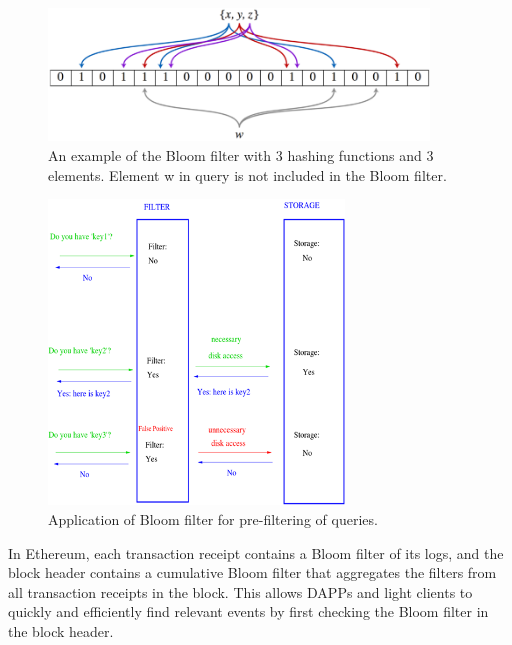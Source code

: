 \begin{figure}[t]
	\begin{center}
		\includegraphics[width=0.9\textwidth]{./figs/bloom.png}
		\caption{An example of the Bloom filter with 3 hashing functions  and 3 elements. Element w in query is not included in the Bloom filter.}		
		\label{fig:eth-bloom-filter}
	\end{center}	
\end{figure}


\begin{figure}[t]
	\begin{center}
		\includegraphics[width=0.7\textwidth]{./figs/bloom-eg.png}
		\caption{Application of Bloom filter for pre-filtering of queries.}		
		\label{fig:bloom-app}
	\end{center}	
\end{figure}



In Ethereum, each transaction receipt contains a Bloom filter of its logs, and the
block header contains a cumulative Bloom filter that aggregates the
filters from all transaction receipts in the block. This allows DAPPs
and light clients to quickly and efficiently find relevant events by
first checking the Bloom filter in the block header.




